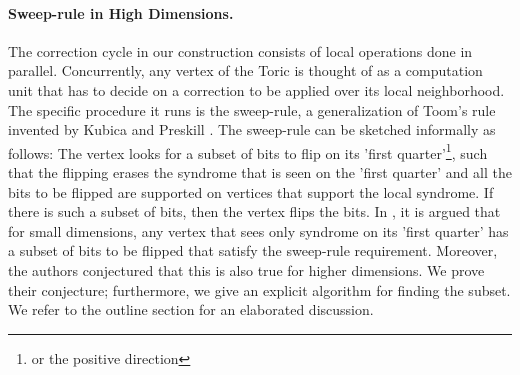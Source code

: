 %

  \paragraph{Sweep-rule in High Dimensions.} 
  The correction cycle in our construction consists of local operations done in parallel. Concurrently, any vertex of the Toric is thought of as a computation unit that has to decide on a correction to be applied over its local neighborhood. The specific procedure it runs is the sweep-rule, a generalization of Toom's rule invented by Kubica and Preskill \cite{Kubica_2019}. The sweep-rule can be sketched informally as follows: The vertex looks for a subset of bits to flip on its 'first quarter'\footnote{or the positive direction}, such that the flipping erases the syndrome that is seen on the 'first quarter' and all the bits to be flipped are supported on vertices that support the local syndrome. If there is such a subset of bits, then the vertex flips the bits. In \cite{Kubica_2019}, it is argued that for small dimensions, any vertex that sees only syndrome on its 'first quarter' has a subset of bits to be flipped that satisfy the sweep-rule requirement. Moreover, the authors conjectured that this is also true for higher dimensions. We prove their conjecture; furthermore, we give an explicit algorithm for finding the subset. We refer to the outline section for an elaborated discussion.
 

